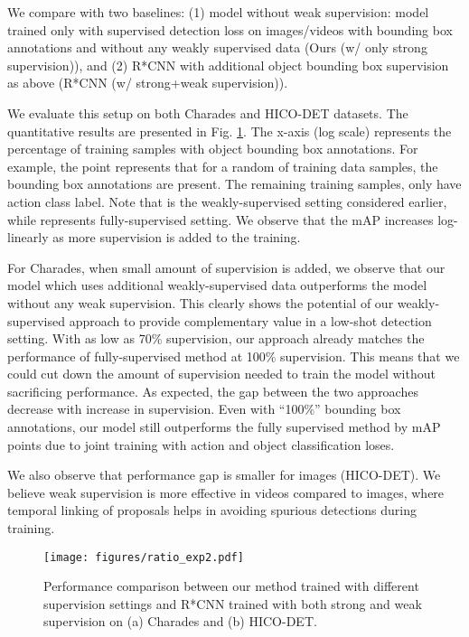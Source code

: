 \documentclass[10pt,twocolumn,letterpaper]{article}
\begin{document}
We compare with two baselines: (1) model without weak supervision: model trained only with supervised detection loss on images/videos with bounding box annotations and without any weakly supervised data (Ours (w/ only strong supervision)),  and (2) R*CNN \cite{gkioxari2015contextual} with additional object bounding box supervision as above (R*CNN (w/ strong+weak supervision)).

We evaluate this setup on both Charades and HICO-DET datasets. The quantitative results are presented in Fig. \ref{fig:semi-supervision}. The x-axis (log scale) represents the percentage of training samples with object bounding box annotations. For example, the point  represents that for a random  of training data samples, the bounding box annotations are present. The remaining training samples, only have action class label. Note that  is the weakly-supervised setting considered earlier, while  represents fully-supervised setting. We observe that the mAP increases log-linearly as more supervision is added to the training.



For Charades, when small amount of supervision is added, we observe that our model which uses additional weakly-supervised data outperforms the model without any weak supervision. This clearly shows the potential of our weakly-supervised approach to provide complementary value in a low-shot detection setting. With as low as 70\% supervision, our approach already matches the performance of fully-supervised method at 100\% supervision. This means that we could cut down the amount of supervision needed to train the model without sacrificing performance. As expected, the gap between the two approaches decrease with increase in supervision. Even with ``100\%'' bounding box annotations, our model still outperforms the fully supervised method by  mAP points due to joint training with action and object classification loses.

We also observe that performance gap is smaller for images (HICO-DET). We believe weak supervision is more effective in videos compared to images, where temporal linking of proposals helps in avoiding spurious detections during training.

\begin{figure}
\centering
\texttt{[image: figures/ratio\_exp2.pdf]}
\caption{Performance comparison between our method trained with different supervision settings and R*CNN trained with both strong and weak supervision on (a) Charades and (b) HICO-DET.}
\label{fig:semi-supervision}
\vspace{-1.3\baselineskip}
\end{figure}
 \vspace{-0.6\baselineskip}
\end{document}

